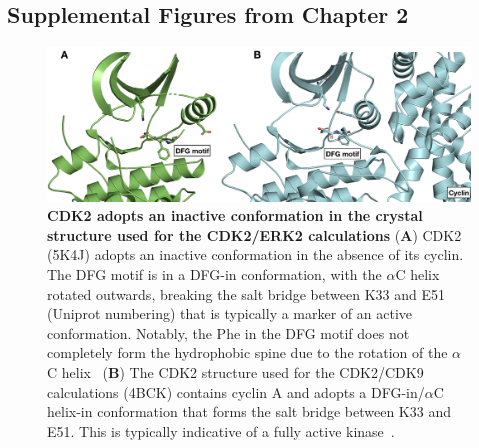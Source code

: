 \documentclass[phd,tocprelim]{cornell}
\begin{document}
\begin{appendices}
	\chapter{Supplemental Figures from Chapter 2}
	
	\begin{landscape}
		\begin{figure}[p]
			\centering
			\includegraphics[width=1.0\linewidth]{figures/supp_figure1.png}
			\caption[CDK2 adopts an inactive conformation in the crystal structure used for the CDK2/ERK2 calculations]{
				{\bf CDK2 adopts an inactive conformation in the crystal structure used for the CDK2/ERK2 calculations} 
				({\bf A}) CDK2 (5K4J) adopts an inactive conformation in the absence of its cyclin. The DFG motif is in a DFG-in conformation, with the $\alpha$C helix rotated outwards, breaking the salt bridge between K33 and E51 (Uniprot numbering) that is typically a marker of an active conformation. Notably, the Phe in the DFG motif does not completely form the hydrophobic spine due to the rotation of the $\alpha$C helix~\citep{Hu:2015kh}
				({\bf B}) The CDK2 structure used for the CDK2/CDK9 calculations (4BCK) contains cyclin A and adopts a DFG-in/$\alpha$C helix-in conformation that forms the salt bridge between K33 and E51. This is typically indicative of a fully active kinase~\citep{Huse2002-ml,Hari:2013dp}. 
			}
			\label{fig:sup-figure-1}
		\end{figure}
	\end{landscape}
	

\end{appendices}
\end{document}
